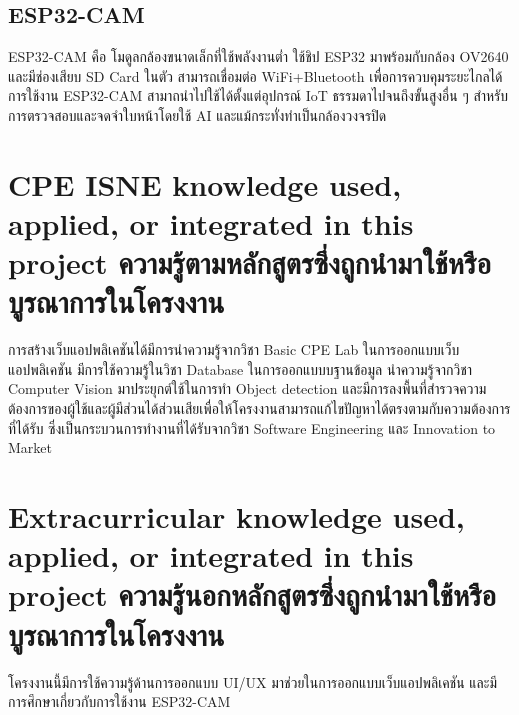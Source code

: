 \subsection{ESP32-CAM}
ESP32-CAM คือ โมดูลกล้องขนาดเล็กที่ใช้พลังงานต่ำ ใช้ชิป ESP32 มาพร้อมกับกล้อง OV2640 และมีช่องเสียบ SD Card ในตัว สามารถเชื่อมต่อ WiFi+Bluetooth เพื่อการควบคุมระยะไกลได้ 
การใช้งาน ESP32-CAM สามาถนำไปใช้ได้ตั้งแต่อุปกรณ์ IoT ธรรมดาไปจนถึงขั้นสูงอื่น ๆ สำหรับการตรวจสอบและจดจำใบหน้าโดยใช้ AI และแม้กระทั่งทำเป็นกล้องวงจรปิด





\section{\ifenglish%
\ifcpe CPE \else ISNE \fi knowledge used, applied, or integrated in this project
\else%
ความรู้ตามหลักสูตรซึ่งถูกนำมาใช้หรือบูรณาการในโครงงาน
\fi
}
การสร้างเว็บแอปพลิเคชันได้มีการนำความรู้จากวิชา Basic CPE Lab ในการออกแบบเว็บแอปพลิเคชัน มีการใช้ความรู้ในวิชา Database
ในการออกแบบบฐานข้อมูล นำความรู้จากวิชา Computer Vision มาประยุกต์ใช้ในการทำ Object detection 
และมีการลงพื้นที่สำรวจความต้องการของผู้ใช้และผู้มีส่วนได้ส่วนเสียเพื่อให้โครงงานสามารถแก้ไขปัญหาได้ตรงตามกับความต้องการที่ได้รับ 
ซึ่งเป็นกระบวนการทำงานที่ได้รับจากวิชา Software Engineering และ Innovation to Market

\section{\ifenglish%
Extracurricular knowledge used, applied, or integrated in this project
\else%
ความรู้นอกหลักสูตรซึ่งถูกนำมาใช้หรือบูรณาการในโครงงาน
\fi
}
โครงงานนี้มีการใช้ความรู้ด้านการออกแบบ UI/UX มาช่วยในการออกแบบเว็บแอปพลิเคชัน และมีการศึกษาเกี่ยวกับการใช้งาน ESP32-CAM 
